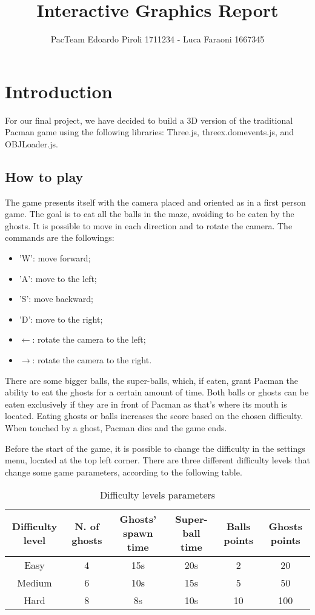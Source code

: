 \documentclass[a4paper,oneside]{report}
\title{Interactive Graphics Report}
\author{PacTeam \cr Edoardo Piroli 1711234 - Luca Faraoni 1667345}
\begin{document}
\maketitle
\tableofcontents

\chapter{Introduction}
For our final project, we have decided to build a 3D version of the traditional Pacman game using the following libraries: Three.js, threex.domevents.js, and OBJLoader.js. 

\section{How to play}
The game presents itself with the camera placed and oriented as in a first person game. The goal is to eat all the balls in the maze, avoiding to be eaten by the ghosts. It is possible to move in each direction and to rotate the camera. The commands are the followings:
\begin{itemize}
\item 'W': move forward;
\item 'A': move to the left;
\item 'S': move backward;
\item 'D': move to the right;
\item $\leftarrow$: rotate the camera to the left;
\item $\rightarrow$: rotate the camera to the right.
\end{itemize}

There are some bigger balls, the super-balls, which, if eaten, grant Pacman the ability to eat the ghosts for a certain amount of time. Both balls or ghosts can be eaten exclusively if they are in front of Pacman as that's where its mouth is located. Eating ghosts or balls increases the score based on the chosen difficulty. When touched by a ghost, Pacman dies and the game ends.

Before the start of the game, it is possible to change the difficulty in the settings menu, located at the top left corner. There are three different difficulty levels that change some game parameters, according to the following table.
\begin{table}[H]
\caption{Difficulty levels parameters}
\begin{center}
\begin{tabular}{|c|c|c|c|c|c|}
\hline
\textbf{Difficulty level} & \textbf{N. of ghosts} & \textbf{Ghosts' spawn time} & \textbf{Super-ball time} & \textbf{Balls points} & \textbf{Ghosts points} \\
\hline
Easy & 4 & 15s & 20s & 2 & 20 \\
\hline
Medium & 6 & 10s & 15s & 5 & 50 \\
\hline
Hard & 8 & 8s & 10s & 10 & 100 \\
\hline
\end{tabular}
\end{center}
\end{table}
\end{document}
